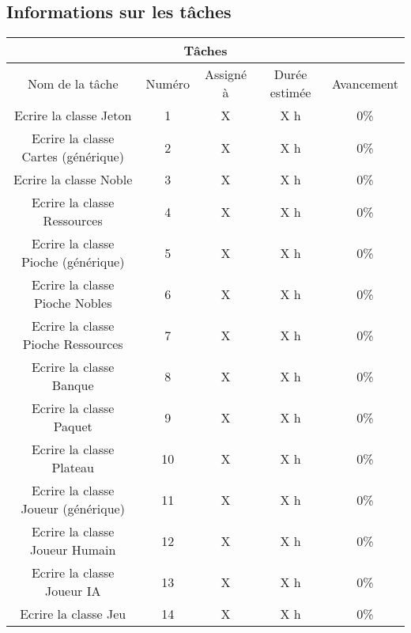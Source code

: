 \documentclass[12pt, letterpaper]{article}
\begin{document}
\subsection{Informations sur les tâches}
\begin{tabular}{ |c||c||c|c|c| }
\hline
\multicolumn{5}{|c|}{Tâches} \\
\hline
Nom de la tâche & Numéro & Assigné à & Durée estimée & Avancement\\
\hline
\hline
Ecrire la classe Jeton & 1 & X & X h & 0\%\\
\hline
Ecrire la classe Cartes (générique) & 2 & X & X h & 0\%\\
\hline
Ecrire la classe Noble & 3 & X & X h & 0\%\\
\hline
Ecrire la classe Ressources & 4 & X & X h & 0\%\\
\hline
Ecrire la classe Pioche (générique) & 5 & X & X h & 0\%\\
\hline
Ecrire la classe Pioche Nobles & 6 & X & X h & 0\%\\
\hline
Ecrire la classe Pioche Ressources & 7 & X & X h & 0\%\\
\hline
Ecrire la classe Banque & 8 & X & X h & 0\%\\
\hline
Ecrire la classe Paquet & 9 & X & X h & 0\%\\
\hline
Ecrire la classe Plateau & 10 & X & X h & 0\%\\
\hline
Ecrire la classe Joueur (générique) & 11 & X & X h & 0\%\\
\hline
Ecrire la classe Joueur Humain & 12 & X & X h & 0\%\\
Ecrire la classe Joueur IA & 13 & X & X h & 0\%\\
\hline
Ecrire la classe Jeu & 14 & X & X h & 0\%\\
\hline
\end{tabular}
\end{document}
